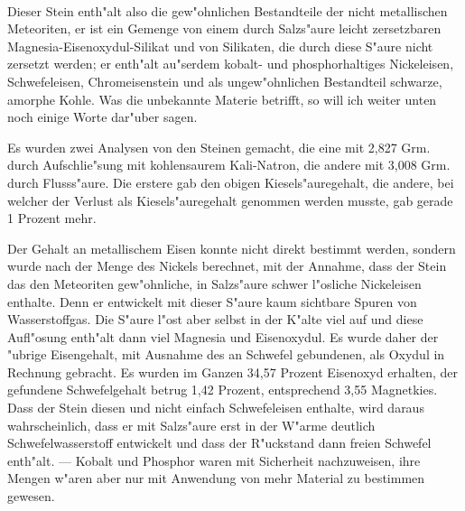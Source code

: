 \documentclass[a4paper, 11pt, oneside]{article}
\begin{document}
\paragraph{}
Dieser Stein enth"alt also die gew"ohnlichen Bestandteile der nicht metallischen Meteoriten, er ist ein Gemenge von einem durch Salzs"aure leicht zersetzbaren Magnesia-Eisenoxydul-Silikat und von Silikaten, die durch diese S"aure nicht zersetzt werden; er enth"alt au"serdem kobalt- und phosphorhaltiges Nickeleisen, Schwefeleisen, Chromeisenstein und als ungew"ohnlichen Bestandteil schwarze, amorphe Kohle. Was die unbekannte Materie betrifft, so will ich weiter unten noch einige Worte dar"uber sagen.

Es wurden zwei Analysen von den Steinen gemacht, die eine mit 2,827 Grm. durch Aufschlie"sung mit kohlensaurem Kali-Natron, die andere mit 3,008 Grm. durch Flusss"aure. Die erstere gab den obigen Kiesels"auregehalt, die andere, bei welcher der Verlust als Kiesels"auregehalt genommen werden musste, gab gerade 1 Prozent mehr.

Der Gehalt an metallischem Eisen konnte nicht direkt bestimmt werden, sondern wurde nach der Menge des Nickels berechnet, mit der Annahme, dass der Stein das den Meteoriten gew"ohnliche, in Salzs"aure schwer l"osliche Nickeleisen enthalte. Denn er entwickelt mit dieser S"aure kaum sichtbare Spuren von Wasserstoffgas. Die S"aure l"ost aber selbst in der K"alte viel auf und diese Aufl"osung enth"alt dann viel Magnesia und Eisenoxydul. Es wurde daher der "ubrige Eisengehalt, mit Ausnahme des an Schwefel gebundenen, als Oxydul in Rechnung gebracht. Es wurden im Ganzen 34,57 Prozent Eisenoxyd erhalten, der gefundene Schwefelgehalt betrug 1,42 Prozent, entsprechend 3,55 Magnetkies. Dass der Stein diesen und nicht einfach Schwefeleisen enthalte, wird daraus wahrscheinlich, dass er mit Salzs"aure erst in der W"arme deutlich Schwefelwasserstoff entwickelt und dass der R"uckstand dann freien Schwefel enth"alt. --- Kobalt und Phosphor waren mit Sicherheit nachzuweisen, ihre Mengen w"aren aber nur mit Anwendung von mehr Material zu bestimmen gewesen.
\end{document}
